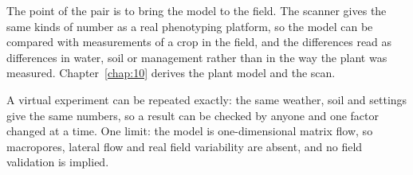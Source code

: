 The point of the pair is to bring the model to the field. The scanner gives the same kinds of number as a real phenotyping platform, so the model can be compared with measurements of a crop in the field, and the differences read as differences in water, soil or management rather than in the way the plant was measured. Chapter~\ref{chap:10} derives the plant model and the scan.

\sol  A virtual experiment can be repeated exactly: the same weather, soil and settings give the same numbers, so a result can be checked by anyone and one factor changed at a time. One limit: the model is one-dimensional matrix flow, so macropores, lateral flow and real field variability are absent, and no field validation is implied.
